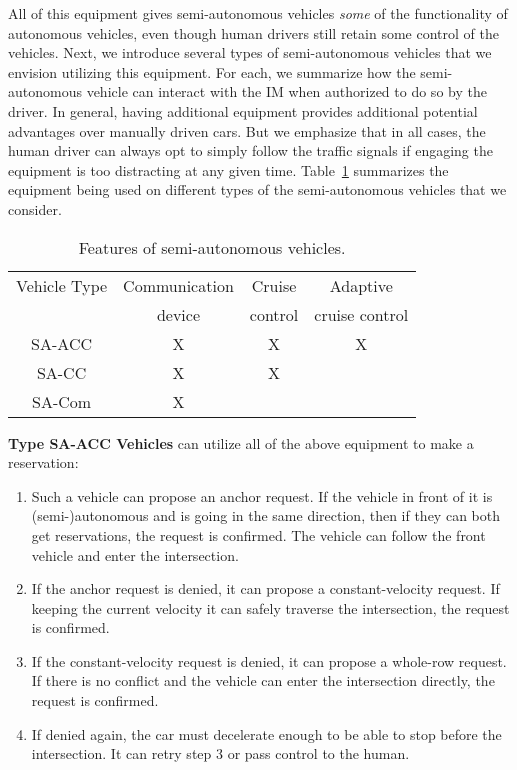 All of this equipment gives semi-autonomous vehicles \emph{some} of
the functionality of autonomous vehicles, even though human drivers
still retain some control of the vehicles.  Next, we introduce several
types of semi-autonomous vehicles that we envision utilizing this
equipment.  For each, we summarize how the semi-autonomous vehicle can
interact with the IM when authorized to do so by the driver.  In
general, having additional equipment provides additional potential
advantages over manually driven cars.  But we emphasize that in all
cases, the human driver can always opt to simply follow the traffic
signals if engaging the equipment is too distracting at any given
time.  Table~\ref{table:type} summarizes the equipment being used on
different types of the semi-autonomous vehicles that we consider.

\begin{table}
\centering
\caption{Features of semi-autonomous vehicles.}
\label{table:type}
\begin{tabular}{|c|c|c|c|}
  \hline
  Vehicle Type & Communication & Cruise & Adaptive \\
               & device & control & cruise control \\
  \hline
  SA-ACC & X & X & X  \\
  \hline
  SA-CC & X & X &  \\
  \hline
  SA-Com & X & &  \\
  \hline
\end{tabular}
\end{table}

\noindent \textbf{Type SA-ACC Vehicles} can utilize all of the above
equipment to make a reservation:
\begin{enumerate}

\item Such a vehicle can propose an anchor request. If the vehicle in
front of it is (semi-)autonomous and is going in the same direction,
then if they can both get reservations, the request is confirmed. The
vehicle can follow the front vehicle and enter the intersection.

\item If the anchor request is denied, it can propose a
constant-velocity request. If keeping the current velocity it can
safely traverse the intersection, the request is confirmed.

\item If the constant-velocity request is denied, it can propose a
whole-row request. If there is no conflict and the vehicle can enter
the intersection directly, the request is confirmed.

\item If denied again, the car must decelerate enough to be able to
stop before the intersection.  It can retry step 3 or pass control to
the human.

\end{enumerate}

